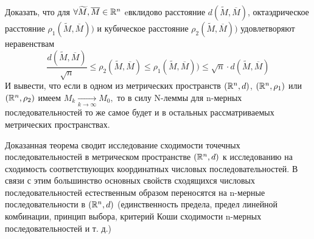 \documentclass[../../main.tex]{subfiles}
\begin{document}
	\begin{exc}
		Доказать, что для $\forall \widetilde M, \overline{M} \in \mathbb{R}^n$ eвклидово расстояние $d(\widetilde M, \overline{M})$, октаэдрическое расстояние $\rho_1(\widetilde M, \overline{M}))$ и кубическое расстояние $\rho_2(\widetilde M, \overline{M}))$ удовлетворяют неравенствам
		\[
		\frac{d(\widetilde M, \overline{M})}{\sqrt{n}} \leqslant \rho_2(\widetilde M, \overline{M}) \leqslant \rho_1(\widetilde M, \overline{M})) \leqslant \sqrt{n}\cdot d(\widetilde M, \overline{M})
		\]
 		И вывести, что если в одном из метрических пространств $(\mathbb{R}^n, d)$, $(\mathbb{R}^n, \rho_1)$ или $(\mathbb{R}^n, \rho_2)$ имеем $M_k \underset{k\rightarrow\infty}{\longrightarrow}  M_0,$ то в силу N-леммы для n-мерных последовательностей то же самое будет и в остальных рассматриваемых метрических пространствах.
	\end{exc}
	
	\begin{rem}
		Доказанная теорема сводит исследование сходимости точечных последовательностей в метрическом пространстве $(\mathbb{R}^n, d)$ к исследованию на сходимость соответствующих координатных числовых последовательностей.
		В связи с этим большинство основных свойств сходящихся числовых последовательностей естественным образом переносятся на n-мерные последовательности в $(\mathbb{R}^n, d)$
		(единственность предела, предел линейной комбинации, принцип выбора, критерий Коши сходимости n-мерных последовательностей и т. д.)
	\end{rem}
\end{document}
